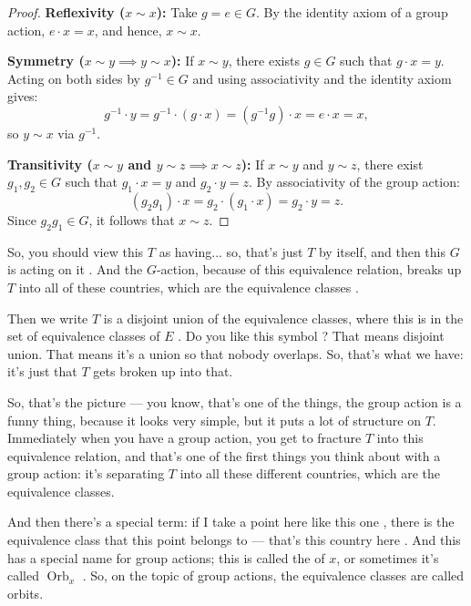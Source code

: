 \begin{proofWrapper}
\begin{content}
\begin{proof}
\textbf{Reflexivity ($x \sim x$):} Take $g = e \in G$. By the identity axiom of a group action, $e \cdot x = x$, and hence, $x \sim x$.

\textbf{Symmetry ($x \sim y \implies y \sim x$):} If $x \sim y$, there exists $g \in G$ such that $g \cdot x = y$. Acting on both sides by $g^{-1} \in G$ and using associativity and the identity axiom gives:
\[
g^{-1} \cdot y = g^{-1} \cdot (g \cdot x) = (g^{-1} g) \cdot x = e \cdot x = x,
\]
so $y \sim x$ via $g^{-1}$.

\textbf{Transitivity ($x \sim y$ and $y \sim z \implies x \sim z$):} If $x \sim y$ and $y \sim z$, there exist $g_1, g_2 \in G$ such that $g_1 \cdot x = y$ and $g_2 \cdot y = z$. By associativity of the group action:
\[
(g_2 g_1) \cdot x = g_2 \cdot (g_1 \cdot x) = g_2 \cdot y = z.
\]
Since $g_2 g_1 \in G$, it follows that $x \sim z$.
\end{proof}
\end{content}
\end{proofWrapper}

\begin{speech}[00:12:22 - 00:13:59]
So, you should view this $T$ as having... so, that's just $T$ by itself, and then this $G$ is acting on it . And the $G$-action, because of this equivalence relation, breaks up $T$ into all of these countries, which are the equivalence classes .

Then we write $T$ is a disjoint union of the equivalence classes, where this is in the set of equivalence classes of $E$ . Do you like this symbol ? That means disjoint union. That means it's a union so that nobody overlaps. So, that's what we have: it's just that $T$ gets broken up into that.

So, that's the picture --- you know, that's one of the things, the group action is a funny thing, because it looks very simple, but it puts a lot of structure on $T$. Immediately when you have a group action, you get to fracture $T$ into this equivalence relation, and that's one of the first things you think about with a group action: it's separating $T$ into all these different countries, which are the equivalence classes.

And then there's a special term: if I take a point here like this one , there is the equivalence class that this point belongs to --- that's this country here . And this has a special name for group actions; this is called the  of $x$, or sometimes it's called $\operatorname{Orb}_x$ . So, on the topic of group actions, the equivalence classes are called orbits.
\end{speech}


